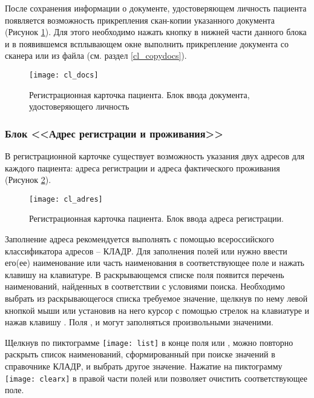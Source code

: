 {После сохранения информации о документе, удостоверяющем личность пациента появляется возможность прикрепления скан-копии указанного документа (Рисунок \ref{img_cl_docs}). Для этого необходимо нажать кнопку  в нижней части данного блока и в появившемся всплывающем окне выполнить прикрепление документа со сканера или из файла (см. раздел \ref{cl_copydocs}).  

\begin{figure}[ht]\centering
 \texttt{[image: cl\_docs]}
 \caption{Регистрационная карточка пациента. Блок ввода документа, удостоверяющего личность}
 \label{img_cl_docs}
\end{figure} 

\subsubsection{Блок <<Адрес регистрации и проживания>>}

В регистрационной карточке существует возможность указания двух адресов для каждого пациента: адреса регистрации и адреса фактического проживания (Рисунок \ref{img_cl_adres}). 

\begin{figure}[ht]\centering
 \texttt{[image: cl\_adres]}
 \caption{Регистрационная карточка пациента. Блок ввода адреса регистрации.}
 \label{img_cl_adres}
\end{figure} 

Заполнение адреса рекомендуется выполнять с помощью всероссийского классификатора адресов -- КЛАДР. Для заполнения полей  или  нужно ввести его(ее) наименование или часть наименования в соответствующее поле и нажать клавишу  на клавиатуре. В раскрывающемся списке поля появится перечень наименований, найденных в соответствии с условиями поиска. Необходимо выбрать из раскрывающегося списка требуемое значение, щелкнув по нему левой кнопкой мыши или установив на него курсор с помощью стрелок на клавиатуре и нажав клавишу . Поля ,  и  могут заполняться произвольными значеними.

Щелкнув по пиктограмме \texttt{[image: list]} в конце поля  или , можно повторно раскрыть список наименований, сформированный при поиске значений в справочнике КЛАДР, и выбрать другое значение. Нажатие на пиктограмму \texttt{[image: clearx]} в правой части полей  или  позволяет очистить соответствующее поле. 

}
